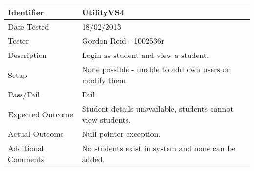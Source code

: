 \vspace{2em}
\begin{tabularx}{\textwidth}{|T|L|}
\hline
Identifier & UtilityVS4\\
\hline
Date Tested & 18/02/2013\\
\hline
Tester & Gordon Reid - 1002536r\\
\hline
Description & Login as student and view a student.\\
\hline
Setup & None possible - unable to add own users or modify them.\\
\hline
Pass/Fail & Fail\\
\hline
Expected Outcome & Student details unavailable, students cannot view
students.\\
\hline
Actual Outcome & Null pointer exception.\\
\hline
Additional Comments & No students exist in system and none can be added.\\
\hline
\end{tabularx}

\vspace{2em}

